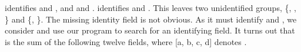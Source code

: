 \documentclass[a4paper,a4paper]{article}
\begin{document}
\coordHE{} identifies \coordHE{} and \coordHE{}, and \coordHE{} and \coordHE{}. 
\coordHE{} identifies \coordHE{} and \coordHE{}. This leaves two unidentified groups, \{\coordHE{}, \coordHE{}, \coordHE{}\} and \{\coordHE{}, \coordHE{}\}.
The missing identity field \coordHE{} is not obvious. As it must identify \coordHE{} and \coordHE{}, we consider \coordHE{} and use our program 
to search for an identifying field. It turns out that 
\coordHE{} is the sum of the following twelve fields, where [a, b, c, d] denotes \coordHE{}. 
\end{document}
